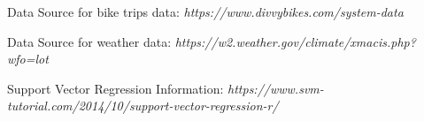 \documentclass[11pt]{article}
\begin{document}
\begin{thebibliography}{99}

 Data Source for bike trips data:
\newblock \emph{https://www.divvybikes.com/system-data}

 Data Source for weather data:
\newblock \emph{https://w2.weather.gov/climate/xmacis.php?wfo=lot}

 Support Vector Regression Information:
\newblock \emph{https://www.svm-tutorial.com/2014/10/support-vector-regression-r/}

\end{thebibliography}
\end{document}
